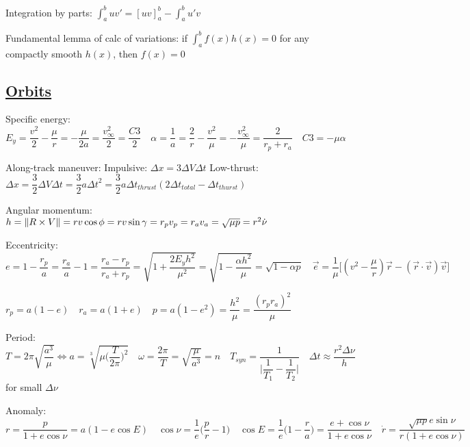 \documentclass[11pt,landscape]{article}
\begin{document}
Integration by parts: $\int_{a}^{b} u v' = [uv]_{a}^{b} - \int_{a}^{b} u'v$

Fundamental lemma of calc of variations:
if $\int_{a}^{b}f(x)h(x) = 0$ for any compactly smooth $h(x)$, then $f(x)=0$




\newpage
\subsection{\underline{Orbits}}

\begin{wrapfigure}{r}{0.25\textwidth}
\end{wrapfigure}

Specific energy:
$
E_y 
= \dfrac{v^2}{2} - \dfrac{\mu}{r} 
= -\dfrac{\mu}{2a} 
= \dfrac{v_{\infty}^2}{2} 
= \dfrac{C3}{2}
\quad
\alpha
= \dfrac{1}{a}
= \dfrac{2}{r} - \dfrac{v^2}{\mu}
= -\dfrac{v_{\infty}^2}{\mu}
= \dfrac{2}{r_p+r_a}
\quad
C3 = -\mu\alpha
$

Along-track maneuver:
\quad
Impulsive:
$\Delta x = 3 \Delta V \Delta t$
\quad
Low-thrust:
$
\Delta x 
= \dfrac{3}{2} \Delta V \Delta t 
= \dfrac{3}{2} a {\Delta t}^2
= \dfrac{3}{2} a \Delta t_{thrust} ( 2\Delta t_{total} - \Delta t_{thurst} )
$

Angular momentum:
$
h
=\left\lVert R \times V \right\rVert
=rv \cos \phi
=rv \sin \gamma
=r_p v_p
=r_a v_a
=\sqrt{\mu p}
=r^2 \dot{\nu}
$

Eccentricity:
$
e 
=1-\dfrac{r_p}{a}
=\dfrac{r_a}{a}-1
=\dfrac{r_a-r_p}{r_a+r_p}
=\sqrt{1+\dfrac{2 E_y h^2}{\mu^2}}
=\sqrt{1-\dfrac{\alpha h^2}{\mu}}
=\sqrt{1-\alpha p}
\quad
\vec{e} = \dfrac{1}{\mu} 
\big[ (v^2-\dfrac{\mu}{r})\vec{r} - (\vec{r} \cdot \vec{v})\vec{v} \big]
$

$
r_p = a(1-e)
\quad
r_a = a(1+e)
\quad
p 
= a(1-e^2)
= \dfrac{h^2}{\mu}
= \dfrac{(r_p r_a)^2}{\mu}
$

Period:
$
T=2\pi\sqrt{\dfrac{a^3}{\mu}}
\Leftrightarrow
a = \sqrt[3]{\mu \big( \dfrac{T}{2\pi} \big)^2} 
\quad
\omega 
= \dfrac{2\pi}{T}
= \sqrt{\dfrac{\mu}{a^3}}
= n
\quad
T_{syn}=\dfrac{1}{\big| \dfrac{1}{T_1} - \dfrac{1}{T_2} \big|}
\quad
\Delta t \approx \dfrac{r^2 \Delta\nu}{h}$ for small $\Delta\nu$

Anomaly:
$
r = \dfrac{p}{1+e\cos\nu} = a(1-e\cos E)
\quad
\cos\nu = \dfrac{1}{e} \big( \dfrac{p}{r}-1 \big)
\quad
\cos E = \dfrac{1}{e} \big( 1- \dfrac{r}{a} \big)
= \dfrac{e+\cos\nu}{1+e\cos\nu}
\quad
\dot{r} = \dfrac{\sqrt{\mu p} e \sin\nu}{r(1+e\cos\nu)}
\quad$
\end{document}
